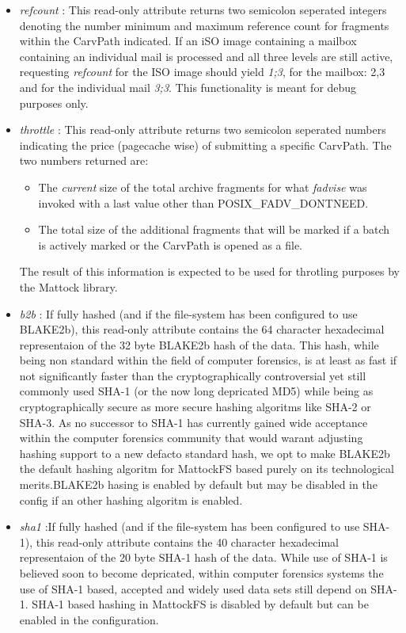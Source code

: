 \begin{Itemize}
\begin{itemize}
\item \emph{refcount} : This read-only attribute returns two semicolon seperated integers denoting the number minimum and maximum reference count for fragments within the CarvPath indicated. If an iSO image containing a mailbox containing an individual mail is processed and all three levels are still active, requesting \emph{refcount} for the ISO image should yield \emph{1;3}, for the mailbox: {2,3} and for the individual mail \emph{3;3}. This functionality is meant for debug purposes only. 
\item \emph{throttle} : This read-only attribute returns two semicolon seperated numbers indicating the price (pagecache wise) of submitting a specific CarvPath. The two numbers returned are:
\begin{itemize} 
\item The \emph{current} size of the total archive fragments for what \emph{fadvise} was invoked with a last value other than POSIX\_FADV\_DONTNEED. 
\item The total size of the additional fragments that will be marked if a batch is actively marked or the CarvPath is opened as a file. 
\end{itemize}
The result of this information is expected to be used for throtling purposes by the Mattock library.   
\item \emph{b2b} : If fully hashed (and if the file-system has been configured to use BLAKE2b), this read-only attribute contains the 64 character hexadecimal representaion of the 32 byte BLAKE2b hash of the data. This hash, while being non standard within the field of computer forensics, is at least as fast if not significantly faster than the cryptographically controversial yet still commonly used SHA-1 (or the now long depricated MD5) while being as cryptographically secure as more secure hashing algoritms like SHA-2 or SHA-3. As no successor to SHA-1 has currently gained wide acceptance within the computer forensics community that would warant adjusting hashing support to a new defacto standard hash, we opt to make BLAKE2b the default hashing algoritm for MattockFS based purely on its technological merits.BLAKE2b hasing is enabled by default but may be disabled in the config if an other hashing algoritm is enabled.
\item \emph{sha1} :If fully hashed (and if the file-system has been configured to use SHA-1), this read-only attribute contains the 40 character hexadecimal representaion of the 20 byte SHA-1 hash of the data. While use of SHA-1 is believed soon to become depricated, within computer forensics systems the use of SHA-1 based, accepted and widely used data sets still depend on SHA-1. SHA-1 based hashing in MattockFS is disabled by default but can be enabled in the configuration.

\end{itemize}
\end{Itemize}
